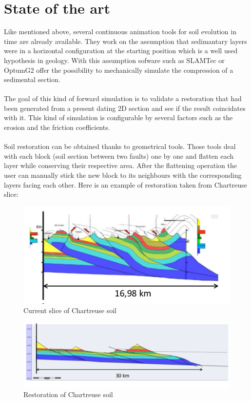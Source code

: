 \documentclass[a4paper,11pt]{article}
\begin{document}
\section{State of the art}

Like mentioned above, several continuous animation tools for soil evolution in time are already available.
They work on the assumption that sedimantary layers were in a horizontal configuration at the starting position which is a well used hypothesis in geology. 
With this assumption sofware such as SLAMTec or OptumG2 offer the possibility to mechanically simulate the compression of a sedimental section.\\\\
The goal of this kind of forward simulation is to validate a restoration that had been generated from a present dating 2D section and see if the result coincidates with it. This kind of simulation is configurable by several factors such as the erosion and the friction coefficients.\\\\
Soil restoration can be obtained thanks to geometrical tools. Those tools deal with each block (soil section between two faults) one by one and flatten each layer while conserving their respective area. After the flattening operation the user can manually stick the new block to its neighbours with the corresponding layers facing each other. 
Here is an example of restoration taken from Chartreuse slice:

\begin{figure}[H]
\centering
\includegraphics[scale=0.9]{Wraped_Section.png}
\caption{Current slice of Chartreuse soil}
\end{figure}

\begin{figure}[H]
\centering
\includegraphics[scale=0.7]{UnWraped_Section.png}
\caption{Restoration of Chartreuse soil}
\end{figure}
\end{document}
